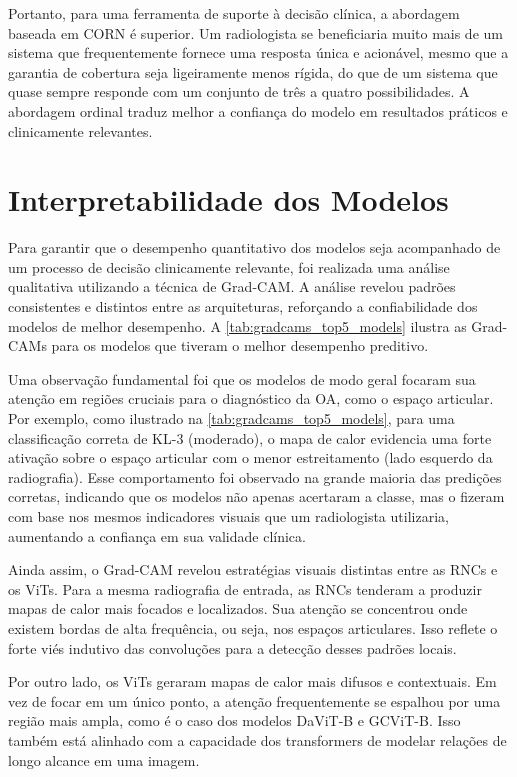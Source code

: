 Portanto, para uma ferramenta de suporte à decisão clínica, a abordagem baseada em CORN é superior. Um radiologista se beneficiaria muito mais de um sistema que frequentemente fornece uma resposta única e acionável, mesmo que a garantia de cobertura seja ligeiramente menos rígida, do que de um sistema que quase sempre responde com um conjunto de três a quatro possibilidades. A abordagem ordinal traduz melhor a confiança do modelo em resultados práticos e clinicamente relevantes.

\section{Interpretabilidade dos Modelos}

Para garantir que o desempenho quantitativo dos modelos seja acompanhado de um processo de decisão clinicamente relevante, foi realizada uma análise qualitativa utilizando a técnica de Grad-CAM. A análise revelou padrões consistentes e distintos entre as arquiteturas, reforçando a confiabilidade dos modelos de melhor desempenho. A \autoref{tab:gradcams_top5_models} ilustra as Grad-CAMs para os modelos que tiveram o melhor desempenho preditivo.

Uma observação fundamental foi que os modelos de modo geral focaram sua atenção em regiões cruciais para o diagnóstico da OA, como o espaço articular. Por exemplo, como ilustrado na \autoref{tab:gradcams_top5_models}, para uma classificação correta de KL-3 (moderado), o mapa de calor evidencia uma forte ativação sobre o espaço articular com o menor estreitamento (lado esquerdo da radiografia). Esse comportamento foi observado na grande maioria das predições corretas, indicando que os modelos não apenas acertaram a classe, mas o fizeram com base nos mesmos indicadores visuais que um radiologista utilizaria, aumentando a confiança em sua validade clínica.

Ainda assim, o Grad-CAM revelou estratégias visuais distintas entre as RNCs e os ViTs. Para a mesma radiografia de entrada, as RNCs tenderam a produzir mapas de calor mais focados e localizados. Sua atenção se concentrou onde existem bordas de alta frequência, ou seja, nos espaços articulares. Isso reflete o forte viés indutivo das convoluções para a detecção desses padrões locais.

Por outro lado, os ViTs geraram mapas de calor mais difusos e contextuais. Em vez de focar em um único ponto, a atenção frequentemente se espalhou por uma região mais ampla, como é o caso dos modelos DaViT-B e GCViT-B. Isso também está alinhado com a capacidade dos transformers de modelar relações de longo alcance em uma imagem.

